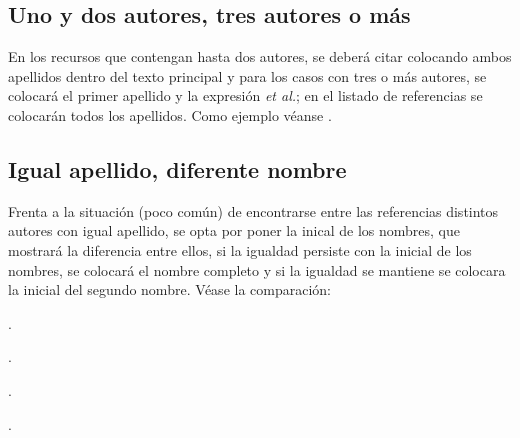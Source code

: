 \documentclass{book}
\begin{document}
{{{{{{{{\subsection{Uno y dos autores, tres autores o más}

En los recursos que contengan hasta dos autores, se deberá citar colocando ambos apellidos dentro del texto principal y para los casos con tres o más autores, se colocará el primer apellido y la expresión \emph{et al.}; en el listado de referencias se colocarán todos los apellidos. Como ejemplo véanse \textcite{Furlough1991,Jauregui-Funes1984,Aguila2016}.

\begin{mdframed}[linewidth=.5pt,linecolor=black!30,roundcorner=3pt,backgroundcolor=yellow!15]
\noindent\vspace{-12pt}
\printbibliography[keyword=unautor,heading=none]
\end{mdframed}

\subsection{Igual apellido, diferente nombre}

Frenta a la situación (poco común) de encontrarse entre las referencias distintos autores con igual apellido, se opta por poner la inical de los nombres, que mostrará la diferencia entre ellos, si la igualdad persiste con la inicial de los nombres, se colocará el nombre completo y si la igualdad se mantiene se colocara la inicial del segundo nombre. Véase la comparación:

\begin{mdframed}[linewidth=.5pt,linecolor=black!30,roundcorner=3pt,backgroundcolor=yellow!15]
\begin{compactitem}
\item \textcite{Irazusta1934}.
\item \textcite{Irazusta1956}.
\item \textcite{DICKMAN1947}.
\item \textcite{DICKMAN-Repetto1947}.
\end{compactitem}
\end{mdframed}

\begin{mdframed}[linewidth=.5pt,linecolor=black!30,roundcorner=3pt,backgroundcolor=yellow!15]
\noindent\vspace{-12pt}
\printbibliography[keyword=igualdad,heading=none]
\end{mdframed}

}}}}}}}}
\end{document}
